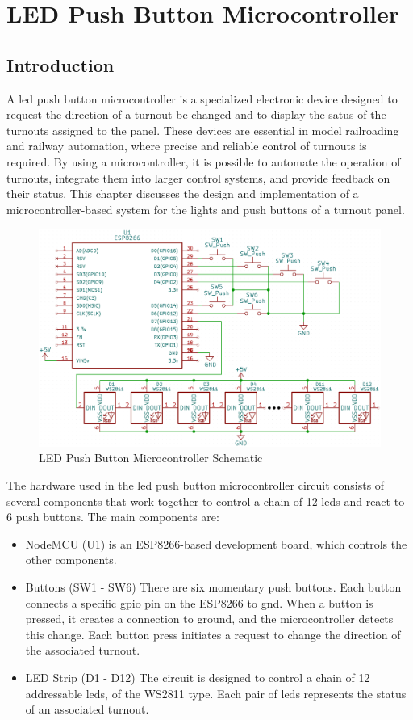 \chapter{LED Push Button Microcontroller}
\section{Introduction}
A \gls{led} push button microcontroller is a specialized electronic device designed to request the direction of a turnout be changed and to display the satus of the turnouts assigned to the panel. These devices are essential in model railroading and railway automation, where precise and reliable control of turnouts is required. By using a microcontroller, it is possible to automate the operation of turnouts, integrate them into larger control systems, and provide feedback on their status. This chapter discusses the design and implementation of a microcontroller-based system for the lights and push buttons of a turnout panel.
\begin{figure}[H]
  \centering
    \includegraphics[scale=0.18]{../Images/lpb_schematic.png}
  \caption{LED Push Button Microcontroller Schematic}
  \label{fig:lpb-schematic}
\end{figure}

The hardware used in the \gls{led} push button microcontroller circuit consists of several components that work together to control a chain of 12 \glspl{led} and react to 6 push buttons. The main components are:
\begin{itemize}
\item NodeMCU (U1) is an ESP8266-based development board, which controls the other components.
\item Buttons (SW1 - SW6) There are six momentary push buttons. Each button connects a specific \gls{gpio} pin on the ESP8266 to \gls{gnd}. When a button is pressed, it creates a connection to ground, and the microcontroller detects this change. Each button press initiates a request to change the direction of the associated turnout.
\item LED Strip (D1 - D12) The circuit is designed to control a chain of 12 addressable \glspl{led}, of the WS2811 type. Each pair of \glspl{led} represents the status of an associated turnout.
\end{itemize}

